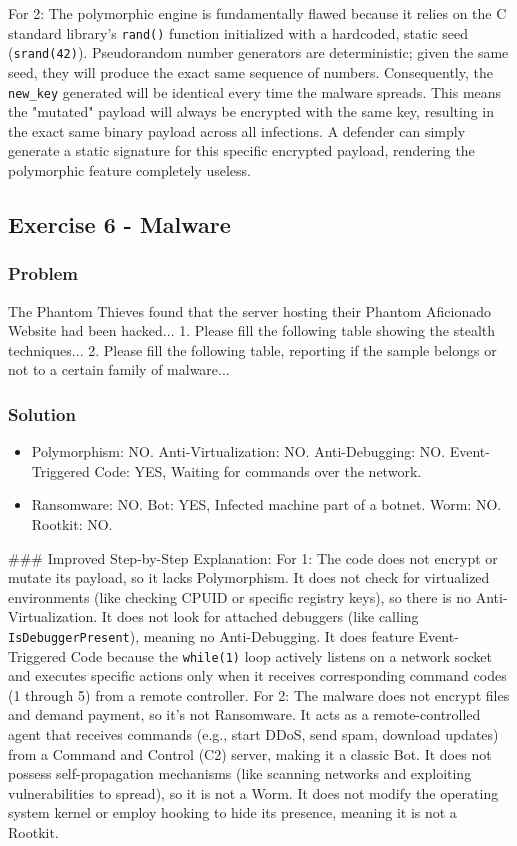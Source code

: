 \documentclass{article}
\begin{document}
For 2: The polymorphic engine is fundamentally flawed because it relies on the C standard library's \texttt{rand()} function initialized with a hardcoded, static seed (\texttt{srand(42)}). Pseudorandom number generators are deterministic; given the same seed, they will produce the exact same sequence of numbers. Consequently, the \texttt{new\_key} generated will be identical every time the malware spreads. This means the "mutated" payload will always be encrypted with the same key, resulting in the exact same binary payload across all infections. A defender can simply generate a static signature for this specific encrypted payload, rendering the polymorphic feature completely useless.

\subsection{Exercise 6 - Malware}
\subsubsection*{Problem}
The Phantom Thieves found that the server hosting their Phantom Aficionado Website had been hacked... 1. Please fill the following table showing the stealth techniques... 2. Please fill the following table, reporting if the sample belongs or not to a certain family of malware...

\subsubsection*{Solution}
\begin{itemize}
    \item[\textbf{1.}] Polymorphism: NO. Anti-Virtualization: NO. Anti-Debugging: NO. Event-Triggered Code: YES, Waiting for commands over the network.
    \item[\textbf{2.}] Ransomware: NO. Bot: YES, Infected machine part of a botnet. Worm: NO. Rootkit: NO.

\end{itemize}
\#\#\# Improved Step-by-Step Explanation:
For 1: The code does not encrypt or mutate its payload, so it lacks Polymorphism. It does not check for virtualized environments (like checking CPUID or specific registry keys), so there is no Anti-Virtualization. It does not look for attached debuggers (like calling \texttt{IsDebuggerPresent}), meaning no Anti-Debugging. It does feature Event-Triggered Code because the \texttt{while(1)} loop actively listens on a network socket and executes specific actions only when it receives corresponding command codes (1 through 5) from a remote controller.
For 2: The malware does not encrypt files and demand payment, so it's not Ransomware. It acts as a remote-controlled agent that receives commands (e.g., start DDoS, send spam, download updates) from a Command and Control (C2) server, making it a classic Bot. It does not possess self-propagation mechanisms (like scanning networks and exploiting vulnerabilities to spread), so it is not a Worm. It does not modify the operating system kernel or employ hooking to hide its presence, meaning it is not a Rootkit.
\end{document}
